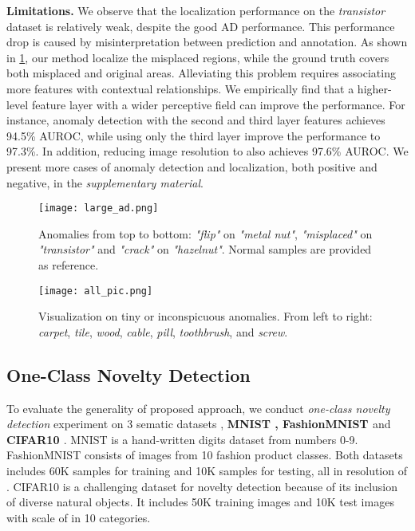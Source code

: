\documentclass[10pt,twocolumn,letterpaper]{article}
\begin{document}
\textbf{Limitations.} We observe that the localization performance on the \emph{transistor} dataset is relatively weak, despite the good AD performance. This performance drop is caused by misinterpretation between prediction and annotation. As shown in \cref{fig:large_ad}, our method localize the misplaced regions, while the ground truth covers both misplaced and original areas. Alleviating this problem requires associating more features with contextual relationships. We empirically find that a higher-level feature layer with a wider perceptive field can improve the performance. For instance, anomaly detection with the second and third layer features achieves 94.5\% AUROC, while using only the third layer improve the performance to 97.3\%. In addition, reducing image resolution to  also achieves 97.6\% AUROC. We present more cases of anomaly detection and localization, both positive and negative, in the \emph{supplementary material}.

\begin{figure}[ht]
\small
  \centering
   \texttt{[image: large\_ad.png]}
   \caption{Anomalies from top to bottom: \emph{"flip"} on \emph{"metal nut"}, \emph{"misplaced"} on \emph{"transistor"} and \emph{"crack"} on \emph{"hazelnut"}. Normal  samples are provided as reference.} \label{fig:large_ad}
\end{figure}


\begin{figure}[ht]
  \centering
   \texttt{[image: all\_pic.png]}
   \caption{Visualization on tiny or inconspicuous anomalies. From left to right: \emph{carpet}, \emph{tile}, \emph{wood}, \emph{cable}, \emph{pill}, \emph{toothbrush}, and \emph{screw}.}
   \label{fig:small_ad}
\end{figure}

\subsection{One-Class Novelty Detection}
To evaluate the generality of proposed approach, we conduct \emph{one-class novelty detection} experiment on 3 sematic datasets \cite{salehi2021unified}, {\bf MNIST \cite{mnist}, FashionMNIST \cite{fmnist}} and {\bf CIFAR10 \cite{cifar10}}. MNIST is a hand-written digits dataset from numbers 0-9. FashionMNIST consists of images from 10 fashion product classes. Both datasets includes 60K samples for training and 10K samples for testing, all in resolution of .
CIFAR10 is a challenging dataset for novelty detection because of its inclusion of diverse natural objects. It includes 50K training images and 10K test images with scale of  in 10 categories. 
\end{document}
